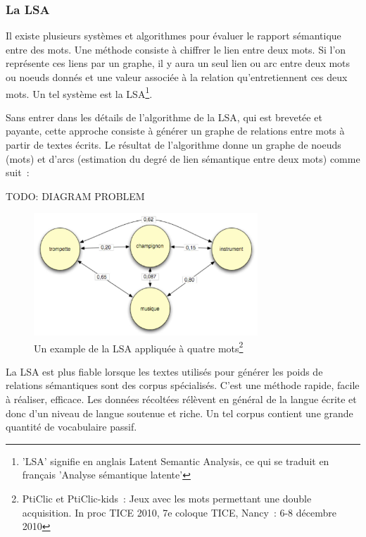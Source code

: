 \documentclass[a4paper,11pt,french]{article}
\begin{document}
\subsubsection{La LSA}

Il existe plusieurs systèmes et algorithmes pour évaluer le rapport sémantique entre des mots. Une méthode consiste à chiffrer le lien entre deux mots. Si l'on représente ces liens par un graphe, il y aura un seul lien ou arc entre deux mots ou noeuds donnés et une valeur associée à la relation qu'entretiennent ces deux mots. Un tel système est la LSA\footnote{'LSA' signifie en anglais Latent Semantic Analysis, ce qui se traduit en français 'Analyse sémantique latente'}. 

Sans entrer dans les détails de l'algorithme de la LSA, qui est brevetée et payante, cette approche consiste à générer un graphe de relations entre mots à partir de textes écrits. Le résultat de l'algorithme donne un graphe de noeuds (mots) et d'arcs (estimation du degré de lien sémantique entre deux mots) comme suit~:

TODO: DIAGRAM PROBLEM

\begin{figure}
 \begin{minipage}{\textwidth}
\centering 
       \includegraphics[width=0.75\textwidth]{img/lsa.jpeg}
    \caption[Caption for LOF]%
      {Un example de la LSA appliquée à quatre mots\footnote{PtiClic et PtiClic-kids~: Jeux avec les mots permettant une double acquisition. In proc TICE 2010, 7e coloque TICE, Nancy~: 6-8 décembre 2010}}
  \end{minipage}
\end{figure}


La LSA est plus fiable lorsque les textes utilisés pour générer les poids de relations sémantiques sont des corpus spécialisés. C'est une méthode rapide, facile à réaliser, efficace. Les données récoltées rélèvent en général de la langue écrite et donc d'un niveau de langue soutenue et riche. Un tel corpus contient une grande quantité de vocabulaire passif.
\end{document}
